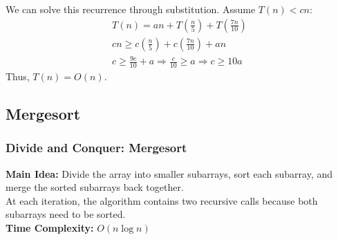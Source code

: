 \documentclass{beamer}
\begin{document}
\begin{frame}
    We can solve this recurrence through substitution. Assume $T(n) < cn$:
    \begin{gather*}
        T(n) = an + T\left(\frac{n}{5}\right) + T\left(\frac{7n}{10}\right) \\
        cn \geq c \left(\frac{n}{5}\right) + c\left(\frac{7n}{10}\right) + an \\
        c \geq \frac{9c}{10} + a \Longrightarrow \frac{c}{10} \geq a  \Longrightarrow c \geq 10 a 
    \end{gather*}
    Thus, $T(n) = O(n)$. 
\end{frame}


\subsection{Mergesort}
\begin{frame}
    \frametitle{Divide and Conquer: Mergesort}
    \textbf{Main Idea:} Divide the array into smaller subarrays, sort each subarray, and merge the sorted subarrays back together. \\[1em]
    At each iteration, the algorithm contains two recursive calls because both subarrays need to be sorted. \\[1em]
    \textbf{Time Complexity:} $O(n\log n)$
\end{frame}
\end{document}
